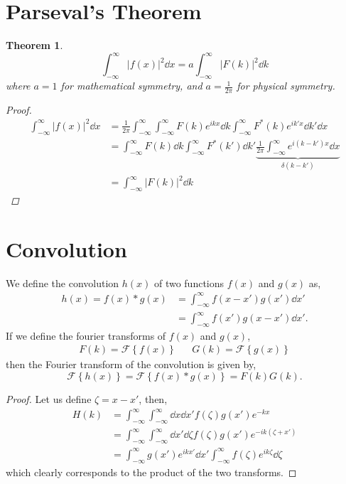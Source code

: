 \documentclass{book}
\newtheorem*{theorem}{Theorem}
\begin{document}
\section{Parseval's Theorem}
\begin{theorem}
\begin{equation}
	\boxed{\int_{-\infty}^{\infty} \left|f(x)\right|^2\dd{x} = a\int_{-\infty}^{\infty}\left|F(k)\right|^2\dd{k}}
\end{equation}
where $a=1$ for mathematical symmetry, and $a= \frac{1}{2\pi}$ for physical symmetry.
\begin{proof}
	\begin{equation}
		\begin{split}
		\int_{-\infty}^{\infty}\left|f(x)\right|^2\dd{x} &= \frac{1}{2\pi}\int_{-\infty}^{\infty}\int_{-\infty}^{\infty}F(k)e^{ikx}\dd{k}\int_{-\infty}^{\infty}F^*(k)e^{ik'x}\dd{k'}\dd{x}\\
		& = \int_{-\infty}^{\infty}F(k)\dd{k}\int_{-\infty}^{\infty}F^*(k')\dd{k'}\underbrace{\frac{1}{2\pi}\int_{-\infty}^{\infty}e^{i(k-k')x}\dd{x}}_{\delta(k-k')} \\
		& = \int_{-\infty}^{\infty}\left|F(k)\right|^2 \dd{k}
		\end{split}
	\end{equation}
\end{proof}
\end{theorem}
\section{Convolution}
We define the convolution $h(x)$ of two functions $f(x)$ and $g(x)$ as,
\begin{equation}
	\begin{split}
		h(x) = f(x) * g(x) & = \int_{-\infty}^{\infty}f(x - x')g(x')\dd{x'} \\
		& = \int_{-\infty}^{\infty}f(x')g(x - x')\dd{x'}.
	\end{split}
\end{equation}
If we define the fourier transforms of $f(x)$ and $g(x)$,
\begin{align}
	F(k) = \mathscr{F}\left\{f(x)\right\} && G(k) = \mathscr{F}\left\{g(x)\right\}
\end{align}
then the Fourier transform of the convolution is given by,
\begin{equation}
	\mathscr{F}\left\{h(x)\right\} = \mathscr{F}\left\{f(x) * g(x)\right\} = F(k)G(k).
\end{equation}
\begin{proof}
	Let us define $\zeta = x - x'$, then,
	\begin{equation}
		\begin{split}
			H(k) & = \int_{-\infty}^{\infty}\int_{-\infty}^{\infty}\dd{x}\dd{x'}f(\zeta)g(x')e^{-kx} \\
			& = \int_{-\infty}^{\infty}\int_{-\infty}^{\infty} \dd{x'}\dd{\zeta}f(\zeta)g(x')e^{-ik(\zeta+x')} \\
			& = \int_{-\infty}^{\infty}g(x')e^{ikx'}\dd{x'}\int_{-\infty}^{\infty}f(\zeta)e^{ik\zeta}\dd{\zeta}
		\end{split}
	\end{equation}
	which clearly corresponds to the product of the two transforms.
\end{proof}
\end{document}
